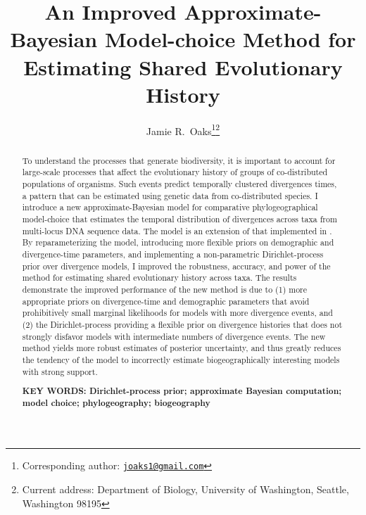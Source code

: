 \documentclass[letterpaper,12pt]{article}
\title{An Improved Approximate-Bayesian Model-choice Method for Estimating
Shared Evolutionary History}
\author[1]{Jamie R.\ Oaks\thanks{Corresponding author: \href{mailto:joaks1@gmail.com}{\tt joaks1@gmail.com}}\thanks{Current address: Department of Biology, University of Washington, Seattle, Washington 98195}}
\affil[1]{Department of Ecology and Evolutionary Biology, University of Kansas, Lawrence, Kansas 66045}
\date{\parbox{\linewidth}{\centering%
    \today\endgraf\bigskip
    \textbf{Running head}: Improved Estimation of Shared Evolutionary History}}
\begin{document}

\maketitle

\begin{abstract}
    To understand the processes that generate biodiversity, it is
    important to account for large-scale processes that affect the evolutionary
    history of groups of co-distributed populations of organisms.
    Such events predict temporally clustered divergences times, a pattern
    that can be estimated using genetic data from co-distributed species.
    I introduce a new approximate-Bayesian model for comparative
    phylogeographical model-choice that estimates the temporal distribution of
    divergences across taxa from multi-locus DNA sequence data.
    The model is an extension of that implemented in \msb.
    By reparameterizing the model, introducing more flexible priors on
    demographic and divergence-time parameters, and implementing a
    non-parametric Dirichlet-process prior over divergence models, I improved
    the robustness, accuracy, and power of the method for estimating shared
    evolutionary history across taxa.
    The results demonstrate the improved performance of the new method is due
    to (1) more appropriate priors on divergence-time and demographic
    parameters that avoid prohibitively small marginal likelihoods for models
    with more divergence events,
    and (2) the Dirichlet-process providing a flexible prior on divergence
    histories that does not strongly disfavor models with intermediate numbers
    of divergence events.
    The new method yields more robust estimates of posterior uncertainty, and
    thus greatly reduces the tendency of the model to incorrectly estimate
    biogeographically interesting models with strong support.

    \vspace{12pt}
    \noindent\textbf{KEY WORDS: Dirichlet-process prior; approximate Bayesian
    computation; model choice; phylogeography; biogeography} 
\end{abstract}
\end{document}
